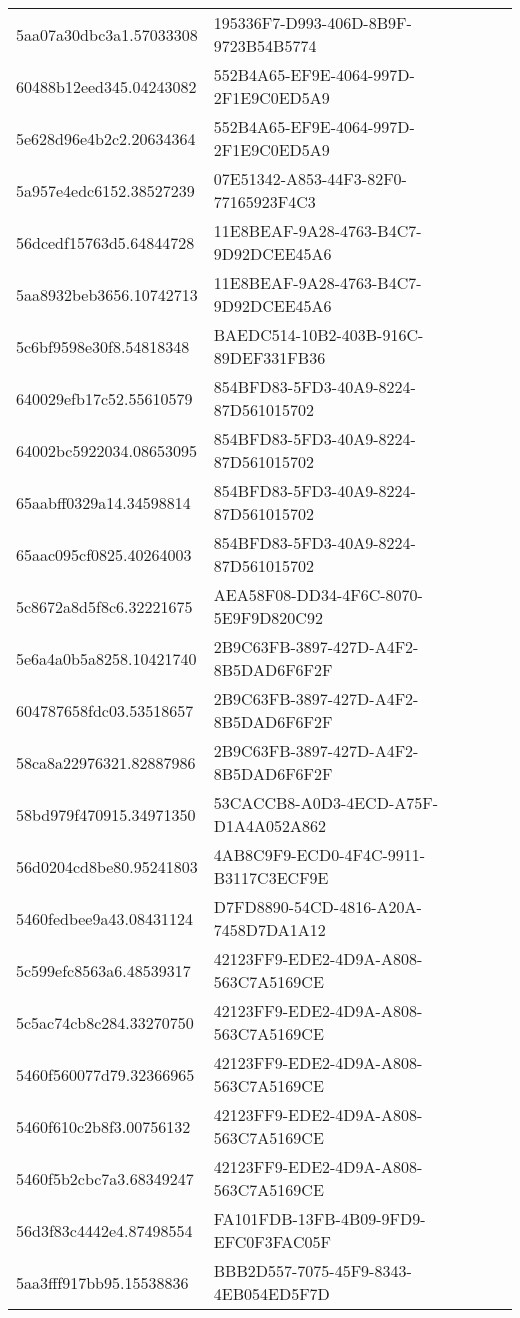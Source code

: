 \begin{tabular}{ll}
5aa07a30dbc3a1.57033308 & 195336F7-D993-406D-8B9F-9723B54B5774 \\
60488b12eed345.04243082 & 552B4A65-EF9E-4064-997D-2F1E9C0ED5A9 \\
5e628d96e4b2c2.20634364 & 552B4A65-EF9E-4064-997D-2F1E9C0ED5A9 \\
5a957e4edc6152.38527239 & 07E51342-A853-44F3-82F0-77165923F4C3 \\
56dcedf15763d5.64844728 & 11E8BEAF-9A28-4763-B4C7-9D92DCEE45A6 \\
5aa8932beb3656.10742713 & 11E8BEAF-9A28-4763-B4C7-9D92DCEE45A6 \\
5c6bf9598e30f8.54818348 & BAEDC514-10B2-403B-916C-89DEF331FB36 \\
640029efb17c52.55610579 & 854BFD83-5FD3-40A9-8224-87D561015702 \\
64002bc5922034.08653095 & 854BFD83-5FD3-40A9-8224-87D561015702 \\
65aabff0329a14.34598814 & 854BFD83-5FD3-40A9-8224-87D561015702 \\
65aac095cf0825.40264003 & 854BFD83-5FD3-40A9-8224-87D561015702 \\
5c8672a8d5f8c6.32221675 & AEA58F08-DD34-4F6C-8070-5E9F9D820C92 \\
5e6a4a0b5a8258.10421740 & 2B9C63FB-3897-427D-A4F2-8B5DAD6F6F2F \\
604787658fdc03.53518657 & 2B9C63FB-3897-427D-A4F2-8B5DAD6F6F2F \\
58ca8a22976321.82887986 & 2B9C63FB-3897-427D-A4F2-8B5DAD6F6F2F \\
58bd979f470915.34971350 & 53CACCB8-A0D3-4ECD-A75F-D1A4A052A862 \\
56d0204cd8be80.95241803 & 4AB8C9F9-ECD0-4F4C-9911-B3117C3ECF9E \\
5460fedbee9a43.08431124 & D7FD8890-54CD-4816-A20A-7458D7DA1A12 \\
5c599efc8563a6.48539317 & 42123FF9-EDE2-4D9A-A808-563C7A5169CE \\
5c5ac74cb8c284.33270750 & 42123FF9-EDE2-4D9A-A808-563C7A5169CE \\
5460f560077d79.32366965 & 42123FF9-EDE2-4D9A-A808-563C7A5169CE \\
5460f610c2b8f3.00756132 & 42123FF9-EDE2-4D9A-A808-563C7A5169CE \\
5460f5b2cbc7a3.68349247 & 42123FF9-EDE2-4D9A-A808-563C7A5169CE \\
56d3f83c4442e4.87498554 & FA101FDB-13FB-4B09-9FD9-EFC0F3FAC05F \\
5aa3fff917bb95.15538836 & BBB2D557-7075-45F9-8343-4EB054ED5F7D \\

\end{tabular}
